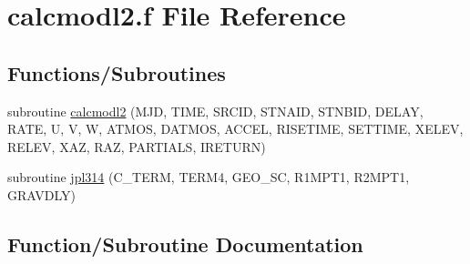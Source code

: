 \hypertarget{calcmodl2_8f}{}\section{calcmodl2.\+f File Reference}
\label{calcmodl2_8f}
\subsection*{Functions/\+Subroutines}
\begin{DoxyCompactItemize}
\item 
subroutine \hyperlink{calcmodl2_8f_a93fe4292d60183d9b8c86d223cba53ab}{calcmodl2} (M\+JD, T\+I\+ME, S\+R\+C\+ID, S\+T\+N\+A\+ID, S\+T\+N\+B\+ID, D\+E\+L\+AY, R\+A\+TE, U, V, W, A\+T\+M\+OS, D\+A\+T\+M\+OS, A\+C\+C\+EL, R\+I\+S\+E\+T\+I\+ME, S\+E\+T\+T\+I\+ME, X\+E\+L\+EV, R\+E\+L\+EV, X\+AZ, R\+AZ, P\+A\+R\+T\+I\+A\+LS, I\+R\+E\+T\+U\+RN)
\item 
subroutine \hyperlink{calcmodl2_8f_a4946db8f413e013754dfec88b5cb45c4}{jpl314} (C\+\_\+\+T\+E\+RM, T\+E\+R\+M4, G\+E\+O\+\_\+\+SC, R1\+M\+P\+T1, R2\+M\+P\+T1, G\+R\+A\+V\+D\+LY)
\end{DoxyCompactItemize}


\subsection{Function/\+Subroutine Documentation}
\mbox{\label{calcmodl2_8f_a93fe4292d60183d9b8c86d223cba53ab}} 
